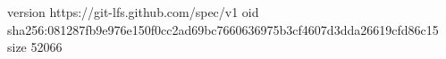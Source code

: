 version https://git-lfs.github.com/spec/v1
oid sha256:081287fb9e976e150f0cc2ad69bc7660636975b3cf4607d3dda26619cfd86c15
size 52066
